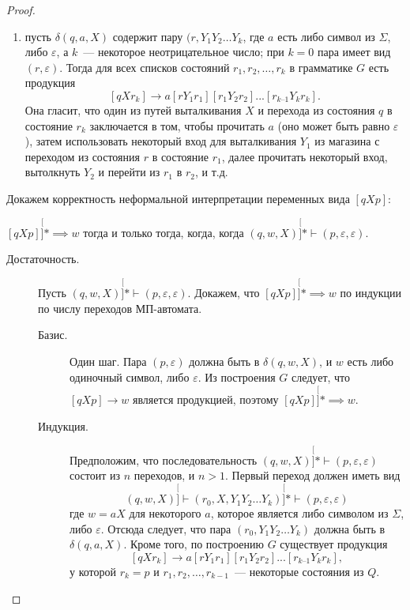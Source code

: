 \documentclass[a4paper,12pt]{article}
\begin{document}
\begin{proof}
\begin{enumerate}
		\item пусть $\delta(q, a, X)$ содержит пару $(r, Y_1 Y_2 \ldots Y_k$, где $a$ есть либо символ из $\Sigma$, либо $\varepsilon$, а $k$~--- некоторое неотрицательное число; при $k = 0$ пара имеет вид $(r, \varepsilon)$. Тогда для всех списков состояний $r_1, r_2, \ldots, r_k$ в грамматике $G$ есть продукция \[[q X r_k] \to a[r Y_1 r_1][r_1 Y_2 r_2]...[r_{k–1} Y_k r_k].\]
		Она гласит, что один из путей выталкивания $X$ и перехода из состояния $q$ в состояние $r_k$ заключается в том, чтобы прочитать $a$ (оно может быть равно $\varepsilon$), затем использовать некоторый вход для выталкивания $Y_1$ из магазина с переходом из состояния $r$ в состояние $r_1$, далее прочитать некоторый вход, вытолкнуть $Y_2$ и перейти из $r_1$ в $r_2$, и т.д.
	\end{enumerate}
	Докажем корректность неформальной интерпретации переменных вида $[qXp]$:
	\begin{theorem}
		$[qXp] \stackrel[]{*}{\implies} w$ тогда и только тогда, когда, когда $(q, w, X) \stackrel[]{*}{\vdash} (p, \varepsilon, \varepsilon)$.
	\end{theorem}
	\begin{description}
		\item[Достаточность.] Пусть $(q, w, X) \stackrel[]{*}{\vdash} (p, \varepsilon, \varepsilon)$. Докажем, что $[qXp] \stackrel[]{*}{\implies} w$ по индукции по числу переходов МП-автомата.
		\begin{description}
			\item[Базис.] Один шаг. Пара $(p, \varepsilon)$ должна быть в $\delta(q, w, X)$, и $w$ есть либо одиночный символ, либо $\varepsilon$. Из построения $G$ следует, что $[qXp] \to w$ является продукцией, поэтому $[qXp] \stackrel[]{*}{\implies} w$.
			
			\item[Индукция.] Предположим, что последовательность $(q, w, X) \stackrel[]{*}{\vdash} (p, \varepsilon, \varepsilon)$ состоит из $n$ переходов, и $n > 1$. Первый переход должен иметь вид
			\[(q, w, X) \stackrel[]{}{\vdash} (r_0, X, Y_1 Y_2 \ldots Y_k) \stackrel[]{*}{\vdash} (p, \varepsilon, \varepsilon)\]
			где $w = aX$ для некоторого $a$, которое является либо символом из $\Sigma$, либо $\varepsilon$. Отсюда следует, что пара $(r_0, Y_1 Y_2 \ldots Y_k)$ должна быть в $\delta(q, a, X)$. Кроме того, по построению $G$ существует продукция \[[q X r_k] \to a[r Y_1 r_1][r_1 Y_2 r_2]...[r_{k–1} Y_k r_k],\] у которой $r_k = p$ и $r_1, r_2, \ldots, r_{k - 1}$~--- некоторые состояния из $Q$.
			

\end{description}
\end{description}
\end{proof}
\end{document}
